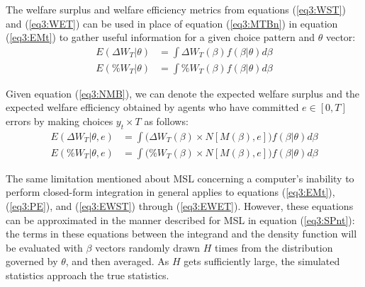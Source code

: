 \documentclass[../main.tex]{subfiles}
\begin{document}
\addtocounter{footnote}{-1}

The welfare surplus and welfare efficiency metrics from equations (\ref{eq3:WST}) and (\ref{eq3:WET}) can be used in place of equation (\ref{eq3:MTBn}) in equation (\ref{eq3:EMt}) to gather useful information for a given choice pattern and $\theta$ vector:
\begin{align}
	E( \Delta W_T | \theta) &= \int \Delta W_T(\beta) f(\beta | \theta) d \beta \label{eq3:EWST}\\
	E( \% W_T | \theta) &= \int \% W_T(\beta) f(\beta | \theta) d \beta \label{eq3:EWET}
\end{align}

Given equation (\ref{eq3:NMB}), we can denote the expected welfare surplus and the expected welfare efficiency obtained by agents who have committed $e \in [0,T]$ errors by making choices $y_t \times T$ as follows:
\begin{align}
	E( \Delta W_T | \theta, e) &= \int \bigr( \Delta W_T(\beta) \times N[M(\beta),e] \bigr) f(\beta | \theta) d \beta \label{eq3:EDWTe}\\
	E( \% W_T | \theta, e) &= \int \bigl( \% W_T(\beta) \times N[M(\beta),e] \bigr) f(\beta | \theta) d \beta \label{eq3:EPWTe}
\end{align}

The same limitation mentioned about MSL concerning a computer's inability to perform closed-form integration in general applies to equations (\ref{eq3:EMt}), (\ref{eq3:PE}), and (\ref{eq3:EWST}) through (\ref{eq3:EWET}).
However, these equations can be approximated in the manner described for MSL in equation (\ref{eq3:SPnt}): the terms in these equations between the integrand and the density function will be evaluated with $\beta$ vectors randomly drawn $H$ times from the distribution governed by $\theta$, and then averaged.
As $H$ gets sufficiently large, the simulated statistics approach the true statistics.
\end{document}
